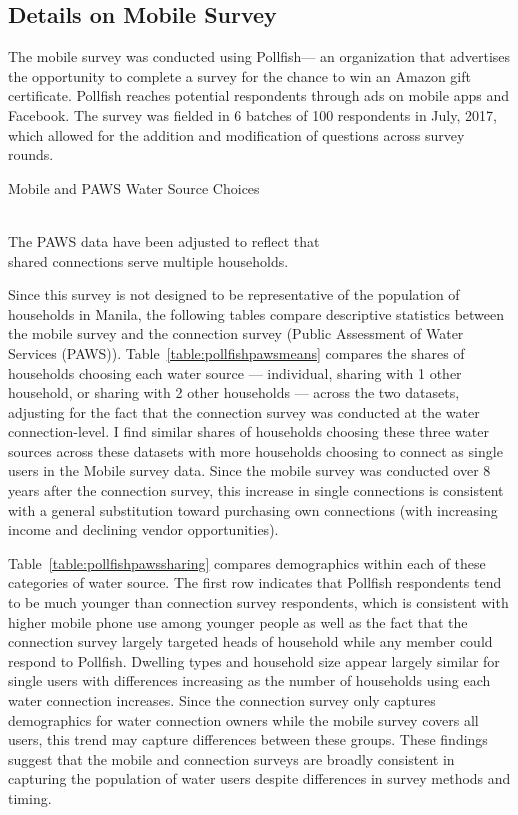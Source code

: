 \documentclass[12pt]{article}
\begin{document}
\begin{appendices}
\section{Details on Mobile Survey}\label{appendix:pollfish}

The mobile survey was conducted using Pollfish--- an organization that advertises the opportunity to complete a survey for the chance to win an Amazon gift certificate.  Pollfish reaches potential respondents through ads on mobile apps and Facebook.  The survey was fielded in 6 batches of 100 respondents in July, 2017, which allowed for the addition and modification of questions across survey rounds.  

\begin{table}
\centering
\caption{Mobile and PAWS Water Source Choices}\label{table:pollfishpawsmeans}
 \\
\vspace{.3cm}
\footnotesize{The PAWS data have been adjusted to reflect that \\ shared connections serve multiple households.}
\end{table}

Since this survey is not designed to be representative of the population of households in Manila, the following tables compare descriptive statistics between the mobile survey and the connection  survey (Public Assessment of Water Services (PAWS)).  Table~\ref{table:pollfishpawsmeans} compares the shares of households choosing each water source --- individual, sharing with 1 other household, or sharing with 2 other households --- across the two datasets, adjusting for the fact that the connection survey was conducted at the water connection-level.  I find similar shares of households choosing these three water sources across these datasets with more households choosing to connect as single users in the Mobile survey data.  Since the mobile survey was conducted over 8 years after the connection survey, this increase in single connections is consistent with a general substitution toward purchasing own connections (with increasing income and declining vendor opportunities).

Table~\ref{table:pollfishpawssharing} compares demographics within each of these categories of water source.  The first row indicates that Pollfish respondents tend to be much younger than connection survey respondents, which is consistent with higher mobile phone use among younger people as well as the fact that the connection survey largely targeted heads of household while any member could respond to Pollfish.  Dwelling types and household size appear largely similar for single users with differences increasing as the number of households using each water connection increases.  Since the connection survey only captures demographics for water connection owners while the mobile survey covers all users, this trend may capture differences between these groups.  These findings suggest that the mobile and connection surveys are broadly consistent in capturing the population of water users despite differences in survey methods and timing.


\end{appendices}
\end{document}
